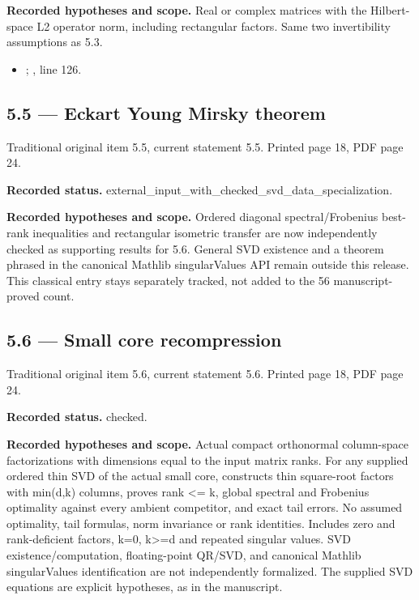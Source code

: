 \textbf{Recorded hypotheses and scope.} Real or complex matrices with the Hilbert-space L2 operator norm, including rectangular factors. Same two invertibility assumptions as 5.3.

\begin{itemize}
\item {}; , line 126.
\end{itemize}
\subsection{5.5 — Eckart Young Mirsky theorem}
\label{result:5.5}
{\footnotesize\color{muted}Traditional original item 5.5, current statement 5.5. Printed page 18, PDF page 24.}\par
\textbf{Recorded status.} external\_input\_with\_checked\_svd\_data\_specialization.

\textbf{Recorded hypotheses and scope.} Ordered diagonal spectral/Frobenius best-rank inequalities and rectangular isometric transfer are now independently checked as supporting results for 5.6. General SVD existence and a theorem phrased in the canonical Mathlib singularValues API remain outside this release. This classical entry stays separately tracked, not added to the 56 manuscript-proved count.

\subsection{5.6 — Small core recompression}
\label{result:5.6}
{\footnotesize\color{muted}Traditional original item 5.6, current statement 5.6. Printed page 18, PDF page 24.}\par
\textbf{Recorded status.} checked.

\textbf{Recorded hypotheses and scope.} Actual compact orthonormal column-space factorizations with dimensions equal to the input matrix ranks. For any supplied ordered thin SVD of the actual small core, constructs thin square-root factors with min(d,k) columns, proves rank <= k, global spectral and Frobenius optimality against every ambient competitor, and exact tail errors. No assumed optimality, tail formulas, norm invariance or rank identities. Includes zero and rank-deficient factors, k=0, k>=d and repeated singular values. SVD existence/computation, floating-point QR/SVD, and canonical Mathlib singularValues identification are not independently formalized. The supplied SVD equations are explicit hypotheses, as in the manuscript.

